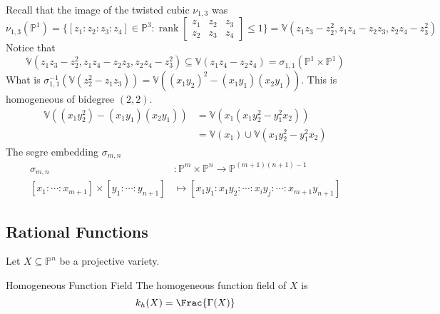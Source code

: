 \documentclass{report}
\begin{document}
Recall that the image of the twisted cubic $ \nu_{1, 3}$ was
    \begin{equation*}
        \nu_{1, 3}(\mathbb{P}^{1}) = \{[z_{1} : z_{2} : z_{3} : z_{4}] \in \mathbb{P}^{3} : \mathop{rank}\begin{bmatrix}
            z_{1} & z_{2} & z_{3} \\
            z_{2} & z_{3} & z_{4}   
        \end{bmatrix}\leq 1\} = \mathbb{V}(z_{1}z_{3} - z_{2}^{2}, z_{1}z_{4} - z_{2}z_{3}, z_{2}z_{4} - z_{3}^{2})
    \end{equation*}
Notice that
    \begin{equation*}
        \mathbb{V}(z_{1}z_{3} - z_{2}^{2}, z_{1}z_{4} - z_{2}z_{3}, z_{2}z_{4} - z_{3}^{2}) \subseteq \mathbb{V}(z_{1}z_{4} - z_{2}z_{4}) = \sigma_{1, 1}(\mathbb{P}^{1} \times \mathbb{P}^{1})
    \end{equation*}
What is $\sigma_{1, 1}^{-1}(\mathbb{V}(z_{2}^{2} - z_{1}z_{3})) = \mathbb{V}((x_{1}y_{2})^{2} - (x_{1}y_{1})(x_{2}y_{1}))$. This is homogeneous of bidegree $(2, 2)$.
    \begin{align*}
        \mathbb{V}((x_{1}y_{2}^{2}) - (x_{1}y_{1})(x_{2}y_{1})) &= \mathbb{V}(x_{1}(x_{1}y^{2}_{2} - y_{1}^{2}x_{2})) \\
                                                                &= \mathbb{V}(x_{1}) \cup \mathbb{V}(x_{1}y_{2}^{2} - y_{1}^{2} x_{2})
    \end{align*}
The segre embedding $\sigma_{m, n}$
    \begin{align*}
        \sigma_{m, n}                                                    &:       \mathbb{P}^{m} \times \mathbb{P}^{n} \rightarrow \mathbb{P}^{(m + 1)(n + 1) - 1} \\
        [x_{1} : \cdots : x_{m + 1}] \times [y_{1} : \cdots : y_{n + 1}] &\mapsto  [x_{1}y_{1} : x_{1}y_{2} : \cdots : x_{i}y_{j} : \cdots : x_{m + 1}y_{n + 1}]     
    \end{align*}

\begin{topic}
    \section{Rational Functions}
\end{topic}

Let $X \subseteq \mathbb{P}^{n}$ be a projective variety.

\begin{definition}{Homogeneous Function Field}
    The homogeneous function field of $X$ is 
        \begin{equation*}
            k_{h}(X) = \Frac{\Gamma(X)}
        \end{equation*}
\end{definition}
\end{document}
